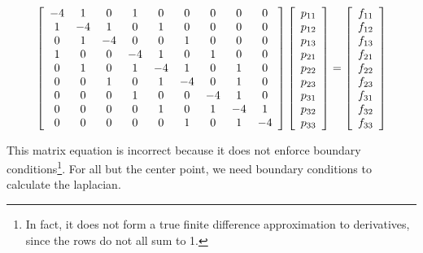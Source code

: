 \documentclass[12pt]{article}
\begin{document}
\[ \left[ \begin{array}{c c c c c c c c c} 
-4&1&0&1&0&0&0&0&0\\ 
1&-4&1&0&1&0&0&0&0\\ 
0&1&-4&0&0&1&0&0&0\\ 
1&0&0&-4&1&0&1&0&0\\ 
0&1&0&1&-4&1&0&1&0 \\ 
0&0&1&0&1&-4&0&1&0\\ 
0&0&0&1&0&0&-4&1&0\\ 
0&0&0&0&1&0&1&-4&1\\ 
0&0&0&0&0&1&0&1&-4\\ \end{array} \right] \left[ \begin{array}{c} p_{11}\\p_{12}\\p_{13}\\p_{21}\\p_{22}\\p_{23}\\p_{31}\\p_{32}\\p_{33}\\ \end{array}\right] = \left[ \begin{array}{c} f_{11}\\f_{12}\\f_{13}\\f_{21}\\f_{22}\\f_{23}\\f_{31}\\f_{32}\\f_{33}\\ \end{array}\right]
\]

This matrix equation is incorrect because it does not enforce boundary conditions\footnote{In fact, it does not form a true finite difference approximation to derivatives, since the rows do not all sum to 1.}. For all but the center point, we need boundary conditions to calculate the laplacian.  
\end{document}
